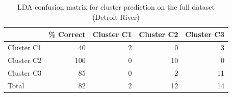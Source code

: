\begin{table}[htbp]
  \centering
  \caption{LDA confusion matrix for cluster prediction on the full dataset (Detroit River)}
  \label{tab:dr_03_LDA_Classification_lda_confusion_matrix}
  \begin{tabular}{lrrrr}
    \toprule
     & \% Correct & Cluster C1 & Cluster C2 & Cluster C3 \\
    \midrule
    Cluster C1 & 40 & 2 & 0 & 3 \\
    Cluster C2 & 100 & 0 & 10 & 0 \\
    Cluster C3 & 85 & 0 & 2 & 11 \\
    Total & 82 & 2 & 12 & 14 \\
    \bottomrule
  \end{tabular}
\end{table}
